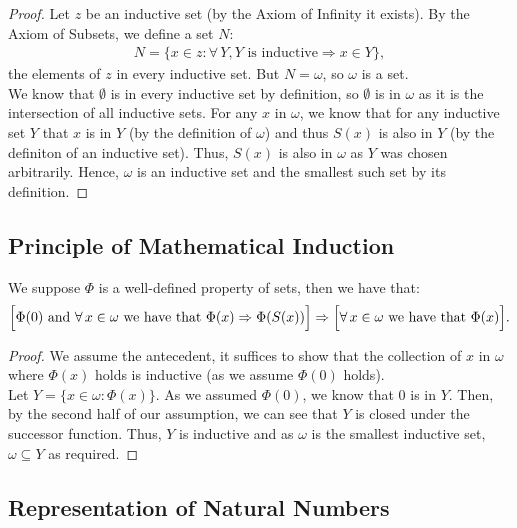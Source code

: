 \begin{proof}
    Let $z$ be an inductive set (by the Axiom of Infinity it 
    exists). By the Axiom of Subsets, we define a set $N$: 
    \begin{align*}
        N = \{x \in z : \forall \, Y, Y \text{ is inductive} \Rightarrow x \in Y \},
    \end{align*} the elements of $z$ in every inductive set.
    But $N = \omega$, so $\omega$ is a set.
    \\[\baselineskip]
    We know that $\emptyset$ is in every inductive set by definition,
    so $\emptyset$ is in $\omega$ as it is the intersection of all
    inductive sets. For any $x$ in $\omega$, we know that for any
    inductive set $Y$ that $x$ is in $Y$ (by the definition of $\omega$)
    and thus $S(x)$ is also in $Y$ (by the definiton of an
    inductive set). Thus, $S(x)$ is also in $\omega$ as $Y$ was chosen
    arbitrarily. Hence, $\omega$ is an inductive set and the smallest
    such set by its definition.
\end{proof}

\newpage

\subsection{Principle of Mathematical Induction}

We suppose $\Phi$ is a well-defined property of sets, then we have that:
\begin{align*}
    \Bigl[
        \Phi(0) \text{ and } 
        \forall \, x \in \omega \text{ we have that }
        \Phi(x) \Rightarrow \Phi(S(x)) 
    \Bigr] 
    \Rightarrow 
    \Bigl[
        \forall \, x \in \omega \text{ we have that } \Phi(x)
    \Bigr].
\end{align*}

\begin{proof}
    We assume the antecedent, it suffices to show that the collection
    of $x$ in $\omega$ where $\Phi(x)$ holds is inductive (as we
    assume $\Phi(0)$ holds).
    \\[\baselineskip]
    Let $Y = \{x \in \omega : \Phi(x)\}$. As we assumed $\Phi(0)$, we
    know that $0$ is in $Y$. Then, by the second half of our assumption,
    we can see that $Y$ is closed under the successor function.
    Thus, $Y$ is inductive and as $\omega$ is the smallest inductive set,
    $\omega \subseteq Y$ as required.
\end{proof}

\subsection{Representation of Natural Numbers}

